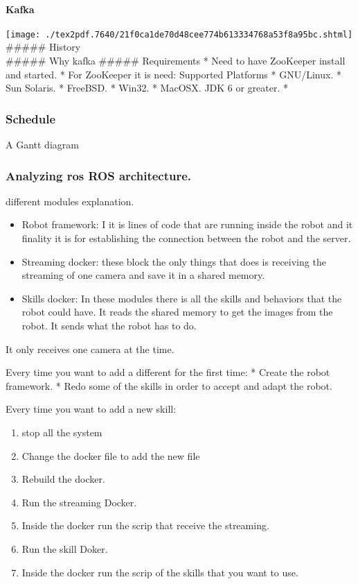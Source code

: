 \documentclass[]{article}
\providecommand{\tightlist}{%
  \setlength{\itemsep}{0pt}\setlength{\parskip}{0pt}}
\let\oldparagraph\paragraph
\renewcommand{\paragraph}[1]{\oldparagraph{#1}\mbox{}}
\begin{document}
\hypertarget{kafka}{%
\paragraph{Kafka}\label{kafka}}

\texttt{[image: ./tex2pdf.7640/21f0ca1de70d48cee774b613334768a53f8a95bc.shtml]}
\#\#\#\#\# History\\
\#\#\#\#\# Why kafka \#\#\#\#\# Requirements * Need to have ZooKeeper
install and started. * For ZooKeeper it is need: Supported Platforms *
GNU/Linux. * Sun Solaris. * FreeBSD. * Win32. * MacOSX. JDK 6 or
greater. *

\hypertarget{schedule}{%
\subsubsection{Schedule}\label{schedule}}

A Gantt diagram

\hypertarget{analyzing-ros-ros-architecture.}{%
\subsubsection{Analyzing ros ROS
architecture.}\label{analyzing-ros-ros-architecture.}}

different modules explanation.

\begin{itemize}
\item
  Robot framework: I it is lines of code that are running inside the
  robot and it finality it is for establishing the connection between
  the robot and the server.
\item
  Streaming docker: these block the only things that does is receiving
  the streaming of one camera and save it in a shared memory.
\item
  Skills docker: In these modules there is all the skills and behaviors
  that the robot could have. It reads the shared memory to get the
  images from the robot. It sends what the robot has to do.
\end{itemize}

It only receives one camera at the time.

Every time you want to add a different for the first time: * Create the
robot framework. * Redo some of the skills in order to accept and adapt
the robot.

Every time you want to add a new skill:

\begin{enumerate}
\def\labelenumi{\arabic{enumi}.}
\tightlist
\item
  stop all the system
\item
  Change the docker file to add the new file
\item
  Rebuild the docker.
\item
  Run the streaming Docker.
\item
  Inside the docker run the scrip that receive the streaming.
\item
  Run the skill Doker.
\item
  Inside the docker run the scrip of the skills that you want to use.
\end{enumerate}
\end{document}
